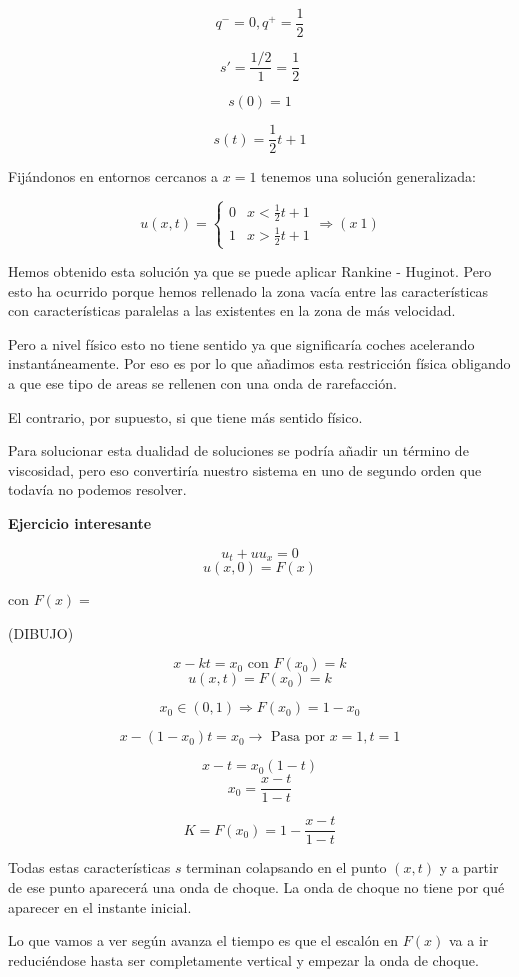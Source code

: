 		$$q^{-} = 0, q^+ = \frac{1}{2}$$

		$$s' = \frac{1/2}{1} = \frac{1}{2}$$

		$$s(0) = 1$$

		$$s(t) = \frac{1}{2}t + 1$$

		Fijándonos en entornos cercanos a $x=1$ tenemos una solución generalizada:

		$$u(x,t) =
		\begin{cases}
			0 & x < \frac{1}{2} t + 1 \\
			1 & x > \frac{1}{2} t + 1
		\end{cases} \Rightarrow (x ~ 1)$$


		Hemos obtenido esta solución ya que se puede aplicar Rankine - Huginot. Pero esto ha ocurrido porque hemos rellenado la zona vacía entre las características con características paralelas a las existentes en la zona de más velocidad.

		Pero a nivel físico esto no tiene sentido ya que significaría coches acelerando instantáneamente. Por eso es por lo que añadimos esta restricción física obligando a que ese tipo de areas se rellenen con una onda de rarefacción.

		El contrario, por supuesto, si que tiene más sentido físico.

		Para solucionar esta dualidad de soluciones se podría añadir un término de viscosidad, pero eso convertiría nuestro sistema en uno de segundo orden que todavía no podemos resolver.

		\textbf{Ejercicio interesante}

			$$u_t + uu_x = 0$$
			$$u(x,0) = F(x) $$

			con $F(x) = $

			(DIBUJO)

			$$x - kt = x_0 \text{ con } F(x_0) = k $$
			$$u(x,t) = F(x_0) = k$$

			$$x_0 \in (0,1) \Rightarrow F(x_0) = 1 - x_0 $$

			$$x - (1-x_0) t = x_0 \rightarrow \text{ Pasa por } x = 1, t = 1$$

			$$x-t = x_0 (1-t)$$
			$$x_0 = \frac{x-t}{1-t}$$

			$$K = F(x_0) = 1 - \frac{x-t}{1-t}$$

			Todas estas características $s$ terminan colapsando en el punto $(x,t)$ y a partir de ese punto aparecerá una onda de choque. La onda de choque no tiene por qué aparecer en el instante inicial.

			Lo que vamos a ver según avanza el tiempo es que el escalón en $F(x)$ va a ir reduciéndose hasta ser completamente vertical y empezar la onda de choque.


